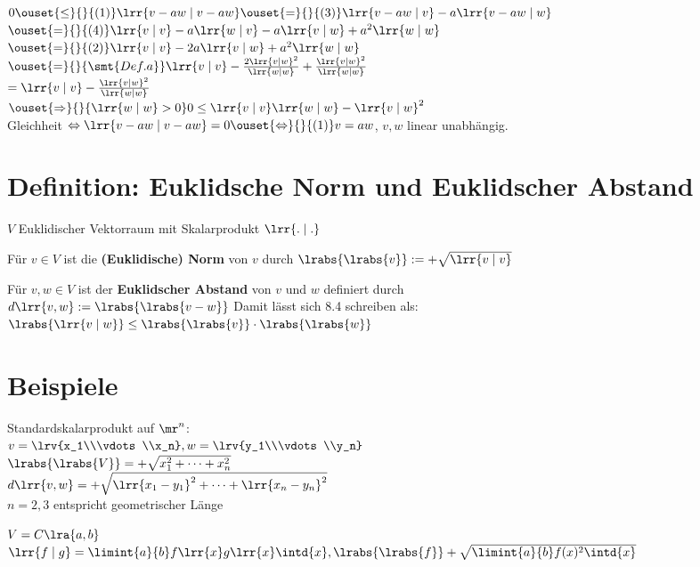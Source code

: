 	$0\ouset{\leq}{}{(1)}\lrr{v-aw\mid v-aw}\ouset{=}{}{(3)}\lrr{v-aw\mid v}-a\lrr{v-aw\mid w}$\\
	$\ouset{=}{}{(4)}\lrr{v\mid v}-a\lrr{w\mid v}-a\lrr{v\mid w}+a^2\lrr{w\mid w}$\\
	$\ouset{=}{}{(2)}\lrr{v\mid v}-2a\lrr{v\mid w}+a^2\lrr{w\mid w}$\\
	$\ouset{=}{}{\smt{Def. a}}\lrr{v\mid v}-\frac{2\lrr{v\mid w}^2}{\lrr{w\mid w}}+\frac{\lrr{v\mid w}^2}{\lrr{w\mid w}}$\\
	$=\lrr{v\mid v}-\frac{\lrr{v\mid w}^2}{\lrr{w\mid w}}$\\
	$\ouset{\Rightarrow}{}{\lrr{w\mid w}>0} 0\leq\lrr{v\mid v}\lrr{w\mid w}-\lrr{v\mid w}^2$\\
	Gleichheit $\Leftrightarrow\lrr{v-aw\mid v-aw}=0\ouset{\Leftrightarrow}{}{(1)}v=aw$, $v,w$ linear unabhängig.

\section{Definition: Euklidsche Norm und Euklidscher Abstand}
	$V$ Euklidischer Vektorraum mit Skalarprodukt $\lrr{.\mid .}$
		\item Für $v\in V$ ist die \textbf{(Euklidische) Norm} von $v$ durch $\lrabs{\lrabs{v}}:=+\sqrt{\lrr{v\mid v}}$
		\item Für $v,w\in V$ ist der \textbf{Euklidscher Abstand} von $v$ und $w$ definiert durch\\
			$d\lrr{v,w}:=\lrabs{\lrabs{v-w}}$
	\subExEnd
	Damit lässt sich 8.4 schreiben als: $\lrabs{\lrr{v\mid w}}\leq\lrabs{\lrabs{v}}\cdot\lrabs{\lrabs{w}}$

\section{Beispiele}
		\item Standardskalarprodukt auf $\mr^n$:\\
			$v=\lrv{x_1\\\vdots\\x_n}, w=\lrv{y_1\\\vdots\\y_n}$\\
			$\lrabs{\lrabs{V}}=+\sqrt{x_1^2+\dots+x_n^2}$\\
			$d\lrr{v,w}=+\sqrt{\lrr{x_1-y_1}^2+\dots+\lrr{x_n-y_n}^2}$\\
			$n=2,3$ entspricht geometrischer Länge
		\item $V=C\lra{a,b}$\\
			$\lrr{f\mid g}=\limint{a}{b}f\lrr{x}g\lrr{x}\intd{x}, \lrabs{\lrabs{f}}+\sqrt{\limint{a}{b}f(x)^2\intd{x}}$
	\subExEnd

